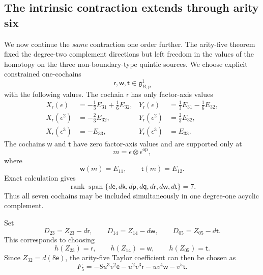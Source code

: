 \documentclass[11pt]{amsart}
\newcommand{\Span}{\operatorname{span}}
\newcommand{\rank}{\operatorname{rank}}
\newcommand{\ghoch}{\mathfrak g}
\begin{document}
\subsection{The intrinsic contraction extends through arity six}\label{subsec:intrinsic-sextic}

We now continue the \emph{same} contraction one order further.  The arity-five theorem fixed the degree-two complement directions but left freedom in the values of the homotopy on the three non-boundary-type quintic sources.  We choose explicit constrained one-cochains
\[
\mathsf r,\mathsf w,\mathsf t\in\ghoch^1_{B,p}
\]
with the following values.  The cochain $\mathsf r$ has only factor-axis values
\begin{align*}
X_{\mathsf r}(\epsilon)
&=-\tfrac13E_{31}+\tfrac16E_{32},
&Y_{\mathsf r}(\epsilon)
&=\tfrac13E_{31}-\tfrac16E_{32},\\
X_{\mathsf r}(\epsilon^2)
&=-\tfrac23E_{32},
&Y_{\mathsf r}(\epsilon^2)
&=\tfrac23E_{32},\\
X_{\mathsf r}(\epsilon^3)
&=-E_{33},
&Y_{\mathsf r}(\epsilon^3)
&=E_{33}.
\end{align*}
The cochains $\mathsf w$ and $\mathsf t$ have zero factor-axis values and are supported only at
\[
m=\epsilon\otimes\epsilon^{\mathrm{op}},
\]
where
\[
\mathsf w(m)=E_{11},
\qquad
\mathsf t(m)=E_{12}.
\]
Exact calculation gives
\begin{equation}\label{eq:arity6-degree1-rank}
\rank\Span\{d\mathsf e,d\mathsf k,d\mathsf p,d\mathsf q,d\mathsf r,d\mathsf w,d\mathsf t\}=7.
\end{equation}
Thus all seven cochains may be included simultaneously in one degree-one acyclic complement.

Set
\begin{equation}\label{eq:arity6-quintic-complement}
D_{23}=Z_{23}-d\mathsf r,
\qquad
D_{14}=Z_{14}-d\mathsf w,
\qquad
D_{05}=Z_{05}-d\mathsf t.
\end{equation}
This corresponds to choosing
\[
h(Z_{23})=\mathsf r,
\qquad
h(Z_{14})=\mathsf w,
\qquad
h(Z_{05})=\mathsf t.
\]
Since $Z_{32}=d(8\mathsf e)$, the arity-five Taylor coefficient can then be chosen as
\begin{equation}\label{eq:intrinsic-F5}
F_5
=
-8u^3v^2\mathsf e
-u^2v^3\mathsf r
-uv^4\mathsf w
-v^5\mathsf t.
\end{equation}
\end{document}
